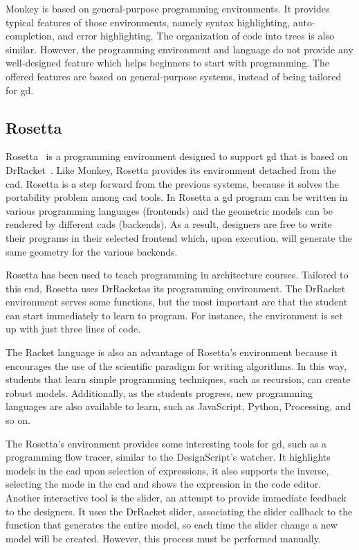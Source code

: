 Monkey is based on general-purpose programming environments. It provides typical features of those environments, namely syntax highlighting, auto-completion, and error highlighting. The organization of code into trees is also similar. However, the programming environment and language do not provide any well-designed feature which helps beginners to start with programming. The offered features are based on general-purpose systems, instead of being tailored for \gls{gd}.
\subsection{Rosetta}
\label{subsec:rosetta}
Rosetta~\cite{lopes2011portable} is a programming environment designed to support \gls{gd} that is based on DrRacket~\cite{findler2002drscheme}. Like Monkey, Rosetta provides its environment detached from the \gls{cad}. Rosetta is a step forward from the previous systems, because it solves the portability problem among \gls{cad} tools. In Rosetta a \gls{gd} program can be written in various programming languages (frontends) and the geometric models can be rendered by different \glspl{cad} (backends). As a result, designers are free to write their programs in their selected frontend which, upon execution, will generate the same geometry for the various backends.

Rosetta has been used to teach programming in architecture courses. Tailored to this end, Rosetta uses DrRacketas its programming environment. The DrRacket environment serves some functions, but the most important are that the student can start immediately to learn to program. For instance, the environment is set up with just three lines of code.

The Racket language is also an advantage of Rosetta's environment because it encourages the use of the scientific paradigm for writing algorithms. In this way, students that learn simple programming techniques, such as recursion, can create robust models. Additionally, as the students progress, new programming languages are also available to learn, such as JavaScript, Python, Processing, and so on.

The Rosetta's environment provides some interesting tools for \gls{gd}, such as a programming flow tracer, similar to the DesignScript's watcher. It highlights models in the \gls{cad} upon selection of expressions, it also supports the inverse, selecting the mode in the \gls{cad} and shows the expression in the code editor. Another interactive tool is the slider, an attempt to provide immediate feedback to the designers. It uses the DrRacket slider, associating the slider callback to the function that generates the entire model, so each time the slider change a new model will be created. However, this process must be performed manually.

